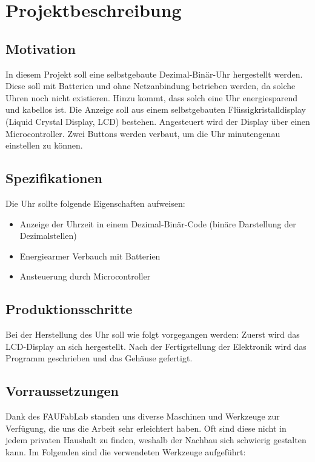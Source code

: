 \section{Projektbeschreibung}
\subsection{Motivation}
In diesem Projekt soll eine selbstgebaute Dezimal-Binär-Uhr hergestellt werden. Diese soll mit Batterien und ohne Netzanbindung betrieben werden, da solche Uhren noch nicht existieren. Hinzu kommt, dass solch eine Uhr energiesparend und kabellos ist. Die Anzeige soll aus einem selbstgebauten Flüssigkristalldisplay (Liquid Crystal Display, LCD) bestehen. Angesteuert wird der Display über einen Microcontroller. Zwei Buttons werden verbaut, um die Uhr minutengenau einstellen zu können.

\subsection{Spezifikationen}
Die Uhr sollte folgende Eigenschaften aufweisen:
\begin{itemize}
\item Anzeige der Uhrzeit in einem Dezimal-Binär-Code (binäre Darstellung der Dezimalstellen)
\item Energiearmer Verbauch mit Batterien
\item Ansteuerung durch Microcontroller
\end{itemize}

\subsection{Produktionsschritte}

Bei der Herstellung des Uhr soll wie folgt vorgegangen werden: Zuerst wird das LCD-Display an sich hergestellt. Nach der Fertigstellung der Elektronik wird das Programm geschrieben und das Gehäuse gefertigt. 

\subsection{Vorraussetzungen}

Dank des FAUFabLab standen uns diverse Maschinen und Werkzeuge zur Verfügung, die uns die Arbeit sehr erleichtert haben. Oft sind diese nicht in jedem privaten Haushalt zu finden, weshalb der Nachbau sich schwierig gestalten kann.
Im Folgenden sind die verwendeten Werkzeuge aufgeführt:

